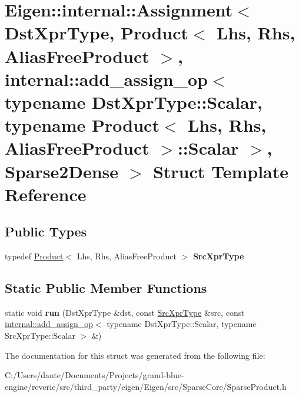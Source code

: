 \hypertarget{struct_eigen_1_1internal_1_1_assignment_3_01_dst_xpr_type_00_01_product_3_01_lhs_00_01_rhs_00_01829d7a1a901a0be4e54bdeda694d8781}{}\section{Eigen\+::internal\+::Assignment$<$ Dst\+Xpr\+Type, Product$<$ Lhs, Rhs, Alias\+Free\+Product $>$, internal\+::add\+\_\+assign\+\_\+op$<$ typename Dst\+Xpr\+Type\+::Scalar, typename Product$<$ Lhs, Rhs, Alias\+Free\+Product $>$\+::Scalar $>$, Sparse2\+Dense $>$ Struct Template Reference}
\label{struct_eigen_1_1internal_1_1_assignment_3_01_dst_xpr_type_00_01_product_3_01_lhs_00_01_rhs_00_01829d7a1a901a0be4e54bdeda694d8781}
\subsection*{Public Types}
\begin{DoxyCompactItemize}
\item 
\mbox{\label{struct_eigen_1_1internal_1_1_assignment_3_01_dst_xpr_type_00_01_product_3_01_lhs_00_01_rhs_00_01829d7a1a901a0be4e54bdeda694d8781_a394636ac491ce75403314e37e12bddcf}} 
typedef \mbox{\hyperlink{class_eigen_1_1_product}{Product}}$<$ Lhs, Rhs, Alias\+Free\+Product $>$ {\bfseries Src\+Xpr\+Type}
\end{DoxyCompactItemize}
\subsection*{Static Public Member Functions}
\begin{DoxyCompactItemize}
\item 
\mbox{\label{struct_eigen_1_1internal_1_1_assignment_3_01_dst_xpr_type_00_01_product_3_01_lhs_00_01_rhs_00_01829d7a1a901a0be4e54bdeda694d8781_a05b9d6144b178e559b94eed1a84adf5e}} 
static void {\bfseries run} (Dst\+Xpr\+Type \&dst, const \mbox{\hyperlink{class_eigen_1_1_product}{Src\+Xpr\+Type}} \&src, const \mbox{\hyperlink{struct_eigen_1_1internal_1_1add__assign__op}{internal\+::add\+\_\+assign\+\_\+op}}$<$ typename Dst\+Xpr\+Type\+::\+Scalar, typename Src\+Xpr\+Type\+::\+Scalar $>$ \&)
\end{DoxyCompactItemize}


The documentation for this struct was generated from the following file\+:\begin{DoxyCompactItemize}
\item 
C\+:/\+Users/dante/\+Documents/\+Projects/grand-\/blue-\/engine/reverie/src/third\+\_\+party/eigen/\+Eigen/src/\+Sparse\+Core/Sparse\+Product.\+h\end{DoxyCompactItemize}
